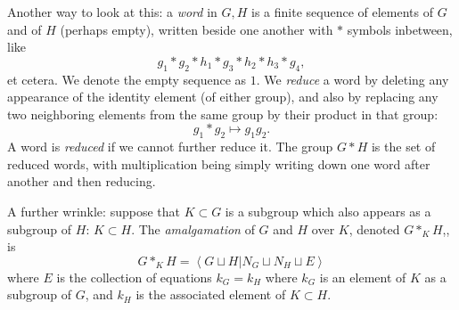 Another way to look at this: a \emph{word} in \(G,H\) is a finite sequence of elements of \(G\) and of \(H\) (perhaps empty), written beside one another with \(*\) symbols inbetween, like
\[
g_1 * g_2 * h_1 * g_3 * h_2 * h_3 * g_4,
\]
et cetera.
We denote the empty sequence as \(1\).
We \emph{reduce} a word by deleting any appearance of the identity element (of either group), and also by replacing any two neighboring elements from the same group by their product in that group:
\[
g_1 * g_2 \mapsto g_1 g_2.
\]
A word is \emph{reduced} if we cannot further reduce it.
The group \(G*H\) is the set of reduced words, with multiplication being simply writing down one word after another and then reducing.

A further wrinkle: suppose that \(K \subset G\) is a subgroup which also appears as a subgroup of \(H\): \(K \subset H\).
The \emph{amalgamation} of \(G\) and \(H\) over \(K\), denoted \(G*_K H\),, is
\[
G *_K H = \left<G \sqcup H|N_G \sqcup N_H \sqcup E\right>
\]
where \(E\) is the collection of equations \(k_G=k_H\) where \(k_G\) is an element of \(K\) as a subgroup of \(G\), and \(k_H\) is the associated element of \(K \subset H\).

